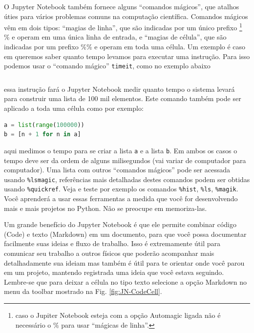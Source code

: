 O Jupyter Notebook também fornece alguns ``comandos mágicos'', que atalhos úties para vários problemas comuns na computação científica. Comandos mágicos vêm em dois tipos: ``magias de linha'', que são indicadas por um único prefixo \footnote{caso o Jupiter Notebook esteja com a opção Automagic ligada não é necessário o \% para usar ``mágicas de linha''.} \% e operam em uma única linha de entrada, e ``magias de célula'', que são indicadas por um prefixo \%\%  e operam em toda uma célula. Um exemplo é caso em queremos saber quanto tempo levamos para executar uma instrução. Para isso podemos usar o ``comando mágico'' {\tt timeit}, como no exemplo abaixo
\begin{lstlisting}[language=Python]
  %timeit list(range(100000))
\end{lstlisting}
essa instrução fará o Jupyter Notebook medir quanto tempo o sistema levará para construir uma lista de 100 mil elementos. Este comando também pode ser aplicado a toda uma célula como por exemplo:
\begin{lstlisting}[language=Python]
%%timeit
a = list(range(100000))
b = [n + 1 for n in a]
\end{lstlisting}
aqui medimos o tempo para se criar a lista {\tt a} e a lista {\tt b}. Em ambos os casos o tempo deve ser da ordem de alguns milisegundos (vai variar de computador para computador).
Uma lista com outros ``comandos mágicos'' pode ser acessada usando {\tt \%lsmagic}, referências mais detalhadas destes comandos podem ser obtidas usando {\tt \%quickref}. Veja e teste por exemplo os comandos {\tt \%hist}, {\tt \%ls}, {\tt \%magik}. Você aprenderá a usar essas ferramentas a medida que você for desenvolvendo mais e mais projetos no Python. Não se preocupe em memoriza-las. 


Um grande benefício do Jupyter Notebook é que ele permite combinar código (Code) e texto (Markdown) em um documento, para que você possa documentar facilmente suas ideias e fluxo de trabalho. Isso é extremamente útil para comunicar seu trabalho a outros físicos que poderão acompanhar mais detalhadamente sua ideiam mas também é útil para te orientar onde você parou em um projeto, mantendo registrada uma ideia que você estava seguindo. Lembre-se que para deixar a célula no tipo texto selecione a opção Markdown no menu da toolbar mostrado na Fig. \ref{fig:JN-CodeCell}. 

